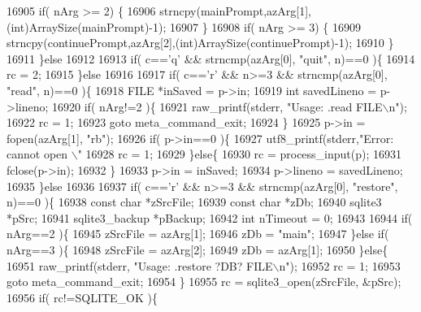 \begin{DoxyCode}
{{{{{{{{{{{{{{{{{{{{{{{{{{{{{{{{{{{{{{{{{{{{{{{{{{{{{{{{{{{{{{{{{{{{{{{{16905     \textcolor{keywordflow}{if}( nArg >= 2) \{
16906       strncpy(mainPrompt,azArg[1],(\textcolor{keywordtype}{int})ArraySize(mainPrompt)-1);
16907     \}
16908     \textcolor{keywordflow}{if}( nArg >= 3) \{
16909       strncpy(continuePrompt,azArg[2],(\textcolor{keywordtype}{int})ArraySize(continuePrompt)-1);
16910     \}
16911   \}\textcolor{keywordflow}{else}
16912 
16913   \textcolor{keywordflow}{if}( c==\textcolor{charliteral}{'q'} && strncmp(azArg[0], \textcolor{stringliteral}{"quit"}, n)==0 )\{
16914     rc = 2;
16915   \}\textcolor{keywordflow}{else}
16916 
16917   \textcolor{keywordflow}{if}( c==\textcolor{charliteral}{'r'} && n>=3 && strncmp(azArg[0], \textcolor{stringliteral}{"read"}, n)==0 )\{
16918     FILE *inSaved = p->in;
16919     \textcolor{keywordtype}{int} savedLineno = p->lineno;
16920     \textcolor{keywordflow}{if}( nArg!=2 )\{
16921       raw_printf(stderr, \textcolor{stringliteral}{"Usage: .read FILE\(\backslash\)n"});
16922       rc = 1;
16923       \textcolor{keywordflow}{goto} meta\_command\_exit;
16924     \}
16925     p->in = fopen(azArg[1], \textcolor{stringliteral}{"rb"});
16926     \textcolor{keywordflow}{if}( p->in==0 )\{
16927       utf8_printf(stderr,\textcolor{stringliteral}{"Error: cannot open \(\backslash\)"%
16928       rc = 1;
16929     \}\textcolor{keywordflow}{else}\{
16930       rc = process_input(p);
16931       fclose(p->in);
16932     \}
16933     p->in = inSaved;
16934     p->lineno = savedLineno;
16935   \}\textcolor{keywordflow}{else}
16936 
16937   \textcolor{keywordflow}{if}( c==\textcolor{charliteral}{'r'} && n>=3 && strncmp(azArg[0], \textcolor{stringliteral}{"restore"}, n)==0 )\{
16938     \textcolor{keyword}{const} \textcolor{keywordtype}{char} *zSrcFile;
16939     \textcolor{keyword}{const} \textcolor{keywordtype}{char} *zDb;
16940     sqlite3 *pSrc;
16941     sqlite3_backup *pBackup;
16942     \textcolor{keywordtype}{int} nTimeout = 0;
16943 
16944     \textcolor{keywordflow}{if}( nArg==2 )\{
16945       zSrcFile = azArg[1];
16946       zDb = \textcolor{stringliteral}{"main"};
16947     \}\textcolor{keywordflow}{else} \textcolor{keywordflow}{if}( nArg==3 )\{
16948       zSrcFile = azArg[2];
16949       zDb = azArg[1];
16950     \}\textcolor{keywordflow}{else}\{
16951       raw_printf(stderr, \textcolor{stringliteral}{"Usage: .restore ?DB? FILE\(\backslash\)n"});
16952       rc = 1;
16953       \textcolor{keywordflow}{goto} meta\_command\_exit;
16954     \}
16955     rc = sqlite3_open(zSrcFile, &pSrc);
16956     \textcolor{keywordflow}{if}( rc!=SQLITE_OK )\{
}}}}}}}}}}}}}}}}}}}}}}}}}}}}}}}}}}}}}}}}}}}}}}}}}}}}}}}}}}}}}}}}}}}}}}}}}
\end{DoxyCode}
